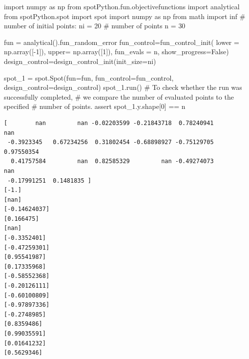 \documentclass[
  letterpaper,
  DIV=11,
  numbers=noendperiod]{scrreprt}
\newenvironment{Shaded}{\begin{snugshade}}{\end{snugshade}}
\newcommand{\CommentTok}[1]{\textcolor[rgb]{0.37,0.37,0.37}{#1}}
\newcommand{\ControlFlowTok}[1]{\textcolor[rgb]{0.00,0.23,0.31}{#1}}
\newcommand{\DecValTok}[1]{\textcolor[rgb]{0.68,0.00,0.00}{#1}}
\newcommand{\ImportTok}[1]{\textcolor[rgb]{0.00,0.46,0.62}{#1}}
\newcommand{\NormalTok}[1]{\textcolor[rgb]{0.00,0.23,0.31}{#1}}
\newcommand{\OperatorTok}[1]{\textcolor[rgb]{0.37,0.37,0.37}{#1}}
\newcommand{\VariableTok}[1]{\textcolor[rgb]{0.07,0.07,0.07}{#1}}
\begin{document}
\begin{Shaded}
\begin{Highlighting}[]
\ImportTok{import}\NormalTok{ numpy }\ImportTok{as}\NormalTok{ np}
\ImportTok{from}\NormalTok{ spotPython.fun.objectivefunctions }\ImportTok{import}\NormalTok{ analytical}
\ImportTok{from}\NormalTok{ spotPython.spot }\ImportTok{import}\NormalTok{ spot}
\ImportTok{import}\NormalTok{ numpy }\ImportTok{as}\NormalTok{ np}
\ImportTok{from}\NormalTok{ math }\ImportTok{import}\NormalTok{ inf}
\CommentTok{\# number of initial points:}
\NormalTok{ni }\OperatorTok{=} \DecValTok{20}
\CommentTok{\# number of points}
\NormalTok{n }\OperatorTok{=} \DecValTok{30}

\NormalTok{fun }\OperatorTok{=}\NormalTok{ analytical().fun\_random\_error}
\NormalTok{fun\_control}\OperatorTok{=}\NormalTok{fun\_control\_init(}
\NormalTok{    lower }\OperatorTok{=}\NormalTok{ np.array([}\OperatorTok{{-}}\DecValTok{1}\NormalTok{]),}
\NormalTok{    upper}\OperatorTok{=}\NormalTok{ np.array([}\DecValTok{1}\NormalTok{]),}
\NormalTok{    fun\_evals }\OperatorTok{=}\NormalTok{ n,}
\NormalTok{    show\_progress}\OperatorTok{=}\VariableTok{False}\NormalTok{)}
\NormalTok{design\_control}\OperatorTok{=}\NormalTok{design\_control\_init(init\_size}\OperatorTok{=}\NormalTok{ni)}

\NormalTok{spot\_1 }\OperatorTok{=}\NormalTok{ spot.Spot(fun}\OperatorTok{=}\NormalTok{fun,}
\NormalTok{                     fun\_control}\OperatorTok{=}\NormalTok{fun\_control,}
\NormalTok{                     design\_control}\OperatorTok{=}\NormalTok{design\_control)}
\NormalTok{spot\_1.run()}
\CommentTok{\# To check whether the run was successfully completed,}
\CommentTok{\# we compare the number of evaluated points to the specified}
\CommentTok{\# number of points.}
\ControlFlowTok{assert}\NormalTok{ spot\_1.y.shape[}\DecValTok{0}\NormalTok{] }\OperatorTok{==}\NormalTok{ n}
\end{Highlighting}
\end{Shaded}

\begin{verbatim}
[        nan         nan -0.02203599 -0.21843718  0.78240941         nan
 -0.3923345   0.67234256  0.31802454 -0.68898927 -0.75129705  0.97550354
  0.41757584         nan  0.82585329         nan -0.49274073         nan
 -0.17991251  0.1481835 ]
[-1.]
[nan]
[-0.14624037]
[0.166475]
[nan]
[-0.3352401]
[-0.47259301]
[0.95541987]
[0.17335968]
[-0.58552368]
[-0.20126111]
[-0.60100809]
[-0.97897336]
[-0.2748985]
[0.8359486]
[0.99035591]
[0.01641232]
[0.5629346]
\end{verbatim}
\end{document}
